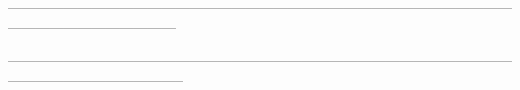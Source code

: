
 ------------------------------------------------------------------------------------------------------------------------------------------------


 --------------------------------------------------------------------------------------------------------------------------------------------------



